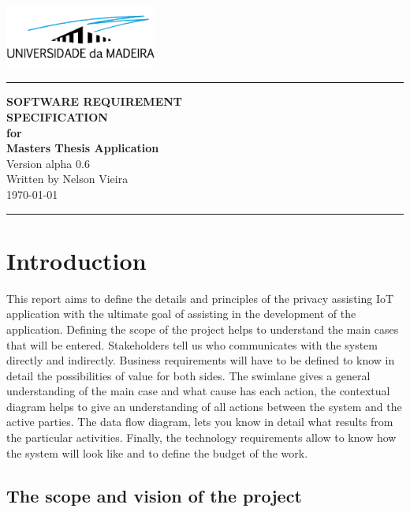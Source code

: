 \documentclass{scrreprt}
\date{}
\begin{document}
\begin{flushright}
    \includegraphics[width=5cm]{../../thesis/assets/images/uma_logo.png}
    \rule{16cm}{5pt}\vskip1cm
    \Huge{\textbf{\uppercase{Software Requirement}} \\ \textbf{\uppercase{Specification}}} \\
    \vspace{1cm}
    \textbf{for} \\
    \vspace{1cm}
    \textbf{Masters Thesis Application} \\
    \vspace{2cm}
    \LARGE{Version alpha 0.6 \\}
    \vspace{2cm}
    Written by Nelson Vieira \\
    \vspace{2cm}
    \today
    \vfill
    \rule{16cm}{5pt}
\end{flushright}

\tableofcontents

\chapter{Introduction}

This report aims to define the details and principles of the privacy assisting
IoT application with the ultimate goal of assisting in the development
of the application. Defining the scope of the project helps to understand
the main cases that will be entered. Stakeholders tell us who communicates
with the system directly and indirectly. Business requirements will have
to be defined to know in detail the possibilities of value for both sides.
The swimlane gives a general understanding of the main case and what cause
has each action, the contextual diagram helps to give an understanding
of all actions between the system and the active parties. The data flow
diagram, lets you know in detail what results from the particular activities.
Finally, the technology requirements allow to know how the system will
look like and to define the budget of the work.

\section{The scope and vision of the project}
\end{document}
